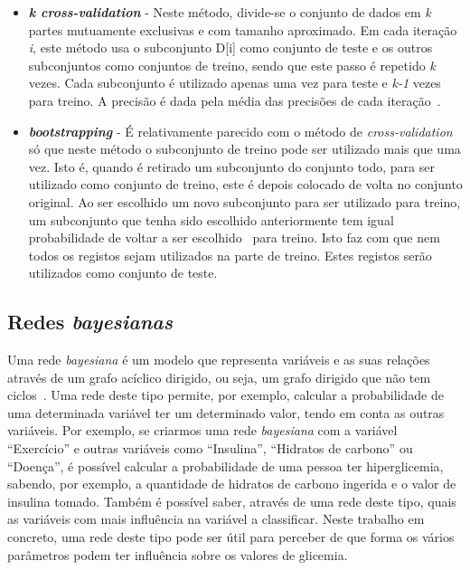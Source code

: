 \begin{itemize}

\item \textbf{\textit{k cross-validation}} - Neste método, divide-se o conjunto de dados em \textit{k} partes mutuamente exclusivas e com tamanho aproximado. Em cada iteração \textit{i}, este método usa o subconjunto D[i] como conjunto de teste e os outros subconjuntos como conjuntos de treino, sendo que este passo é repetido \textit{k} vezes. Cada subconjunto é utilizado apenas uma vez para teste e \textit{k-1} vezes para treino. A precisão é dada pela média das precisões de cada iteração~\cite{svm}.  

\item \textbf{\textit{bootstrapping}} - É relativamente parecido com o método de \textit{cross-validation} só que neste método o subconjunto de treino pode ser utilizado mais que uma vez. Isto é, quando é retirado um subconjunto do conjunto todo, para ser utilizado como conjunto de treino, este é depois colocado de volta no conjunto original. Ao ser escolhido um novo subconjunto para ser utilizado para treino, um subconjunto que tenha sido escolhido anteriormente tem igual probabilidade de voltar a ser escolhido~\cite{bootstrap} para treino. Isto faz com que nem todos os registos sejam utilizados na parte de treino. Estes registos serão utilizados como conjunto de teste.

\end{itemize}

\subsection{Redes \textit{bayesianas}}
Uma rede \textit{bayesiana} é um modelo que representa variáveis e as suas relações através de um grafo acíclico dirigido, ou seja, um grafo dirigido que não tem ciclos~\cite{bayes}. Uma rede deste tipo permite, por exemplo, calcular a probabilidade de uma determinada variável ter um determinado valor, tendo em conta as outras variáveis. Por exemplo, se criarmos uma rede \textit{bayesiana} com a variável ``Exercício'' e outras variáveis como ``Insulina'', ``Hidratos de carbono'' ou ``Doença'', é possível calcular a probabilidade de uma pessoa ter hiperglicemia, sabendo, por exemplo, a quantidade de hidratos de carbono ingerida e o valor de insulina tomado. Também é possível saber, através de uma rede deste tipo, quais as variáveis com mais influência na variável a classificar. Neste trabalho em concreto, uma rede deste tipo pode ser útil para perceber de que forma os vários parâmetros podem ter influência sobre os valores de glicemia.

